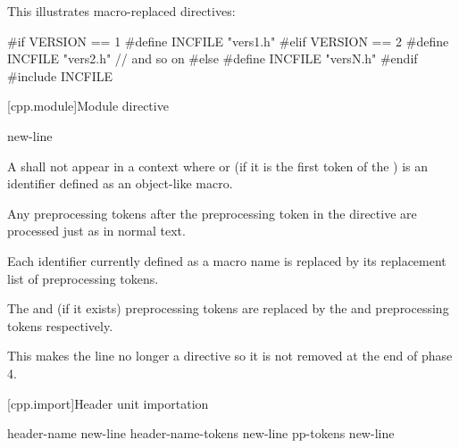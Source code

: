 \pnum
\begin{example}
This illustrates macro-replaced
directives:
\begin{codeblock}
#if VERSION == 1
    #define INCFILE  "vers1.h"
#elif VERSION == 2
    #define INCFILE  "vers2.h"  // and so on
#else
    #define INCFILE  "versN.h"
#endif
#include INCFILE
\end{codeblock}
\end{example}

[cpp.module]{Module directive}
%

\begin{bnf}
\br
       \terminal{;} new-line
\end{bnf}

\pnum
A  shall not
appear in a context where 
or (if it is the first token of the ) 
is an identifier defined as an object-like macro.

\pnum
Any preprocessing tokens after the  preprocessing token
in the  directive are processed just as in normal text.
\begin{note}
Each identifier currently defined as a macro name
is replaced by its replacement list of preprocessing tokens.
\end{note}

\pnum
The  and  (if it exists) preprocessing tokens
are replaced by the  and
 preprocessing tokens respectively.
\begin{note}
This makes the line no longer a directive
so it is not removed at the end of phase 4.
\end{note}

[cpp.import]{Header unit importation}
%
%
%

\begin{bnf}
\br
      header-name  \terminal{;} new-line\br
      header-name-tokens  \terminal{;} new-line\br
      pp-tokens \terminal{;} new-line
\end{bnf}

